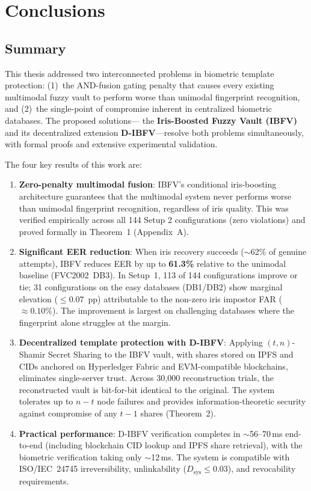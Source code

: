 \chapter{Conclusions}
\label{ch:conclusions}

\section{Summary}
\label{sec:conclusions_summary}

This thesis addressed two interconnected problems in biometric template protection:
(1)~the AND-fusion gating penalty that causes every existing multimodal fuzzy vault
to perform worse than unimodal fingerprint recognition, and (2)~the single-point
of compromise inherent in centralized biometric databases. The proposed solutions---
the \textbf{Iris-Boosted Fuzzy Vault (IBFV)} and its decentralized extension
\textbf{D-IBFV}---resolve both problems simultaneously, with formal proofs and
extensive experimental validation.

The four key results of this work are:

\begin{enumerate}
  \item \textbf{Zero-penalty multimodal fusion}: IBFV's conditional iris-boosting
  architecture guarantees that the multimodal system never performs worse than
  unimodal fingerprint recognition, regardless of iris quality. This was verified
  empirically across all 144 Setup 2 configurations (zero violations) and proved
  formally in Theorem~1 (Appendix~A).

  \item \textbf{Significant EER reduction}: When iris recovery succeeds ($\sim$62\%
  of genuine attempts), IBFV reduces EER by up to \textbf{61.3\%} relative to
  the unimodal baseline (FVC2002~DB3). In Setup~1, 113 of 144 configurations
  improve or tie; 31 configurations on the easy databases (DB1/DB2) show marginal
  elevation ($\leq 0.07$~pp) attributable to the non-zero iris impostor FAR
  ($\approx 0.10\%$). The improvement is largest on challenging databases where the
  fingerprint alone struggles at the margin.

  \item \textbf{Decentralized template protection with D-IBFV}: Applying
  $(t,n)$-Shamir Secret Sharing to the IBFV vault, with shares stored on IPFS
  and CIDs anchored on Hyperledger Fabric and EVM-compatible blockchains,
  eliminates single-server trust. Across 30{,}000 reconstruction trials, the
  reconstructed vault is bit-for-bit identical to the original. The system tolerates
  up to $n{-}t$ node failures and provides information-theoretic security against
  compromise of any $t{-}1$ shares (Theorem~2).

  \item \textbf{Practical performance}: D-IBFV verification completes in
  $\sim$56--70\,ms end-to-end (including blockchain CID lookup and IPFS share
  retrieval), with the biometric verification taking only $\sim$12\,ms. The system
  is compatible with ISO/IEC~24745 irreversibility, unlinkability ($D_\mathrm{sys}
  \leq 0.03$), and revocability requirements.
\end{enumerate}

